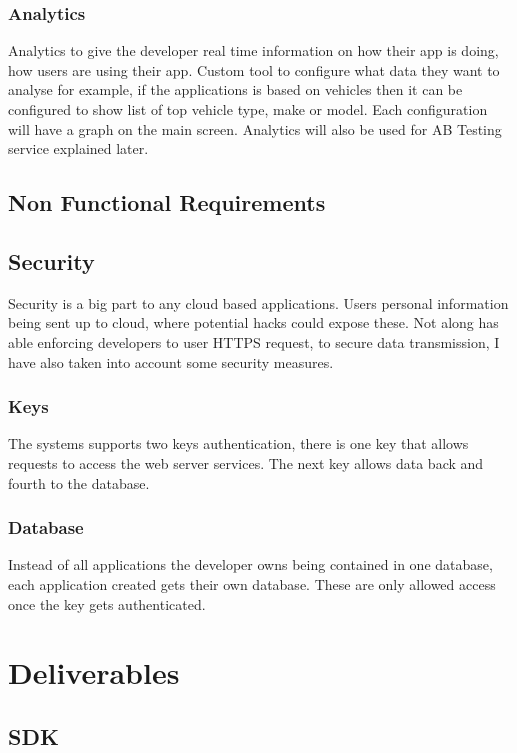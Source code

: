 \subsubsection{Analytics}
Analytics to give the developer real time information on how their app is doing, how users are using their app. Custom tool to configure what data they want to analyse for example, if the applications is based on vehicles then it can be configured to show list of top vehicle type, make or model. Each configuration will have a graph on the main screen. Analytics will also be used for AB Testing service explained later.

\subsection{Non Functional Requirements}

\subsection{Security}
Security is a big part to any cloud based applications. Users personal information being sent up to cloud, where potential hacks could expose these. Not along has able enforcing developers to user HTTPS request, to secure data transmission, I have also taken into account some security measures. 

\subsubsection{Keys}
The systems supports two keys authentication, there is one key that allows requests to access the web server services. The next key allows data back and fourth to the database.

\subsubsection{Database}
Instead of all applications the developer owns being contained in one database, each application created gets their own database. These are only allowed access once the key gets authenticated.

\section{Deliverables}

\subsection{SDK}

